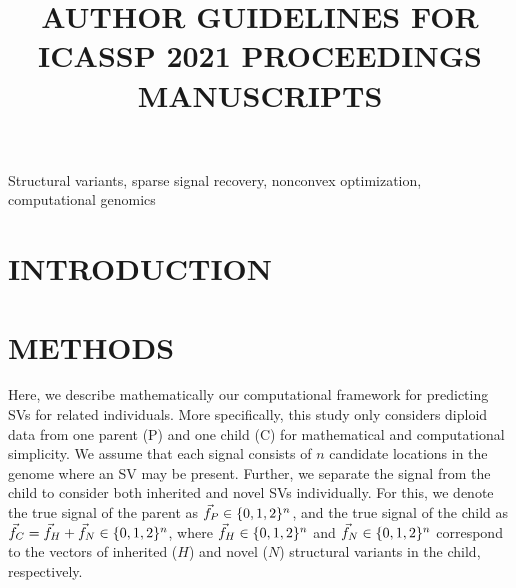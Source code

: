 

\title{AUTHOR GUIDELINES FOR ICASSP 2021 PROCEEDINGS MANUSCRIPTS}
%
\address{$^{\star}$ Department of Applied Mathematics University of California, Merced \\
	$^{\dagger}$Department of Mathematics California State University, Fresno}


	\ninept
	\maketitle
	

	\begin{keywords}
		Structural variants, sparse signal recovery, nonconvex optimization, computational genomics
	\end{keywords}


	\section{INTRODUCTION}
	\label{sec:intro}
	
		
		
	\section{METHODS}
	\label{sec:methods}
	
	Here, we describe mathematically our computational framework for predicting SVs for related individuals. More specifically, this study only considers diploid data from one parent (P) and one child (C) for mathematical and computational simplicity. We assume that each signal consists of $n$ candidate locations in the genome where an SV may be present. Further, we separate the signal from the child to consider both inherited and novel SVs individually. For this, we denote the true signal of the parent as $ \vec{f}_P  \in \{0,1,2\}^n $, and the true signal of the child as $\vec{f}_C = \vec{f}_H +\vec{f}_N \in \{0,1,2\}^{n}$, where $\vec{f}_H \in \{0,1,2\}^n$ and $\vec{f}_N \in \{0,1,2\}^n$ correspond to the vectors of inherited ($H$) and novel ($N$) structural variants in the child, respectively.
	
